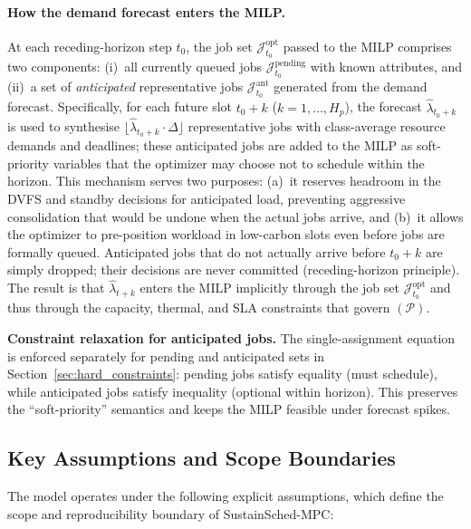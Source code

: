 \documentclass[a4paper,fleqn]{cas-dc}
\begin{document}
\paragraph{How the demand forecast enters the MILP.}
At each receding-horizon step $t_0$, the job set $\mathcal{J}^{\mathrm{opt}}_{t_0}$ passed to the MILP comprises two components: (i)~all currently queued jobs $\mathcal{J}^{\mathrm{pending}}_{t_0}$ with known attributes, and (ii)~a set of \emph{anticipated} representative jobs $\mathcal{J}^{\mathrm{ant}}_{t_0}$ generated from the demand forecast. Specifically, for each future slot $t_0 + k$ ($k = 1, \ldots, H_p$), the forecast $\hat{\lambda}_{t_0+k}$ is used to synthesise $\lfloor \hat{\lambda}_{t_0+k} \cdot \Delta \rfloor$ representative jobs with class-average resource demands and deadlines; these anticipated jobs are added to the MILP as soft-priority variables that the optimizer may choose not to schedule within the horizon. This mechanism serves two purposes: (a)~it reserves headroom in the DVFS and standby decisions for anticipated load, preventing aggressive consolidation that would be undone when the actual jobs arrive, and (b)~it allows the optimizer to pre-position workload in low-carbon slots even before jobs are formally queued. Anticipated jobs that do not actually arrive before $t_0 + k$ are simply dropped; their decisions are never committed (receding-horizon principle). The result is that $\hat{\lambda}_{t+k}$ enters the MILP implicitly through the job set $\mathcal{J}^{\mathrm{opt}}_{t_0}$ and thus through the capacity, thermal, and SLA constraints that govern $(\mathcal{P})$.

\textbf{Constraint relaxation for anticipated jobs.}
The single-assignment equation is enforced separately for pending and anticipated sets in Section~\ref{sec:hard_constraints}: pending jobs satisfy equality (must schedule), while anticipated jobs satisfy inequality (optional within horizon). This preserves the ``soft-priority'' semantics and keeps the MILP feasible under forecast spikes.

\subsection{Key Assumptions and Scope Boundaries}
\label{sec:assumptions}

The model operates under the following explicit assumptions, which define the scope and reproducibility boundary of SustainSched-MPC:
\end{document}
